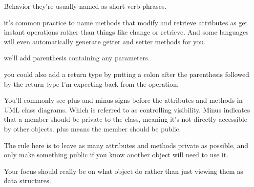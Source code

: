 Behavior 
  they're usually named as short verb phrases.

  it's common practice to name methods that modify and retrieve attributes as get instant operations rather than things like change or retrieve.
  And some languages will even automatically generate getter and setter methods for you.

  we'll add parenthesis containing any parameters.

  you could also add a return type by putting a colon after the parenthesis followed by the return type I'm expecting back from the operation.

  You'll commonly see plus and minus signs before the attributes and methods in UML class diagrams. 
  Which is referred to as controlling visibility.
  Minus indicates that a member should be private to the class, meaning it's not directly accessible by other objects.
  plus means the member should be public. 

  The rule here is to leave as many attributes and methods private as possible, and only make something public if you know another object will need to use it.

  Your focus should really be on what object do rather than just viewing them as data structures.